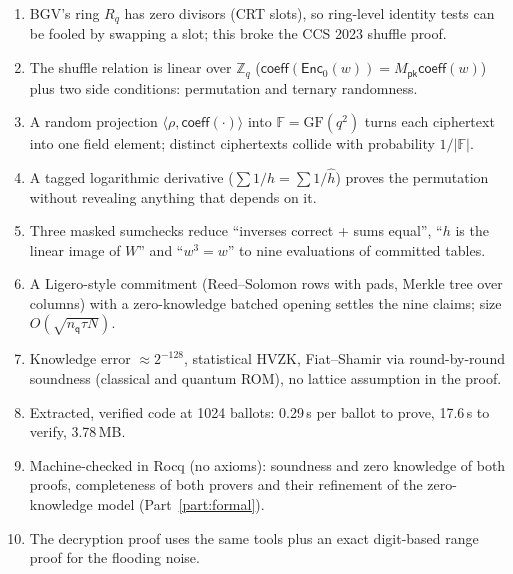 \documentclass[11pt,a4paper]{article}
\newcommand{\Zq}{\mathbb{Z}_q}
\newcommand{\Rq}{R_q}
\newcommand{\F}{\mathbb{F}}
\newcommand{\EncZ}{\mathsf{Enc}_0}
\newcommand{\coeff}{\mathsf{coeff}}
\newcommand{\Mpk}{M_{\mathsf{pk}}}
\newcommand{\ip}[2]{\langle #1, #2\rangle}
\newcommand{\nq}{n_{\mathsf{q}}}
\newcommand{\hh}{\hat{h}}
\theoremstyle{definition}
\theoremstyle{plain}
\begin{document}
\begin{recap}
\begin{enumerate}[leftmargin=1.5em,itemsep=1pt]
\item BGV's ring $\Rq$ has zero divisors (CRT slots), so ring-level identity tests can be fooled by swapping a
  slot; this broke the CCS 2023 shuffle proof.
\item The shuffle relation is linear over $\Zq$ ($\coeff(\EncZ(w))=\Mpk\coeff(w)$) plus two side conditions:
  permutation and ternary randomness.
\item A random projection $\ip{\rho}{\coeff(\cdot)}$ into $\F=\mathrm{GF}(q^2)$ turns each ciphertext into one field
  element; distinct ciphertexts collide with probability $1/|\F|$.
\item A tagged logarithmic derivative ($\sum1/h=\sum1/\hh$) proves the permutation without revealing anything
  that depends on it.
\item Three masked sumchecks reduce ``inverses correct + sums equal'', ``$h$ is the linear image of $W$'' and
  ``$w^3=w$'' to nine evaluations of committed tables.
\item A Ligero-style commitment (Reed--Solomon rows with pads, Merkle tree over columns) with a zero-knowledge
  batched opening settles the nine claims; size $O(\sqrt{\nq\tau N})$.
\item Knowledge error $\approx2^{-128}$, statistical HVZK, Fiat--Shamir via round-by-round soundness (classical
  and quantum ROM), no lattice assumption in the proof.
\item Extracted, verified code at 1024 ballots: 0.29\,s per ballot to prove, 17.6\,s to verify, 3.78\,MB.
\item Machine-checked in Rocq (no axioms): soundness and zero knowledge of both proofs, completeness of both
  provers and their refinement of the zero-knowledge model (Part~\ref{part:formal}).
\item The decryption proof uses the same tools plus an exact digit-based range proof for the flooding noise.
\end{enumerate}
\end{recap}
\end{document}
